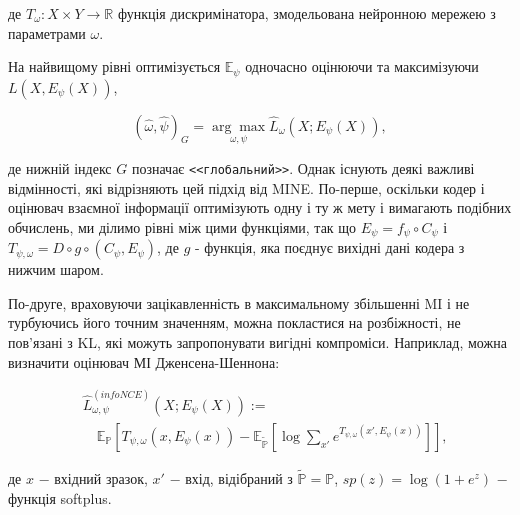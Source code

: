 \noindent де $T_{\omega}: X \times Y \rightarrow \mathbb{R}$ функція дискримінатора, змодельована нейронною мережею з параметрами $\omega$.

\vspace{1.5em}

На найвищому рівні оптимізується $\mathbb{E_{\psi}}$ одночасно оцінюючи та максимізуючи $L(X, E_{\psi}(X))$,

\begin{equation}\label{eq:e_psi_opt}
(\hat{\omega}, \hat{\psi})_{G} = \underset{\omega,\psi}{\arg\max}\hat{L}_{\omega}(X;E_{\psi}(X)),
\end{equation}

\vspace{1.5em}

\noindent де нижній індекс $G$ позначає \texttt{<<глобальний>>}. Однак існують деякі важливі відмінності, які відрізняють цей підхід від MINE. По-перше, оскільки кодер і оцінювач взаємної інформації оптимізують одну і ту ж мету і вимагають подібних обчислень, ми ділимо рівні між цими функціями, так що $E_{\psi} = f_{\psi} \circ C_{\psi}$ і $T_{\psi, \omega} = D \circ g \circ (C_{\psi}, E_{\psi})$, де $g$ - функція, яка поєднує вихідні дані кодера з нижчим шаром.

По-друге, враховуючи зацікавленність в максимальному збільшенні MI і не турбуючись його точним значенням, можна покластися на розбіжності, не пов’язані з KL, які можуть запропонувати вигідні компроміси. Наприклад, можна визначити оцінювач МІ Дженсена-Шеннона:

\begin{equation}\label{eq:mi}
\begin{aligned}
&\hat{L}_{\omega, \psi}^{(infoNCE)}(X;E_{\psi}(X)) := \\
&\quad \mathbb{E_{P}}\left[T_{\psi,\omega}(x, E_{\psi}(x)) - \mathbb{E_{\tilde{P}}}\left[\log{\sum_{x'}{e^{T_{\psi, \omega}(x',E_{\psi}(x))}}}\right]\right],
\end{aligned}
\end{equation}

\noindent де $x$ $-$ вхідний зразок, \newline
\hspace*{15pt} $x'$ $-$ вхід, відібраний з $\tilde{\mathbb{P}} = \mathbb{P}$, \newline
\hspace*{15pt} $sp(z) = \log{(1 + e^{z})}$ $-$ функція softplus. 

\vspace{1.5em}

